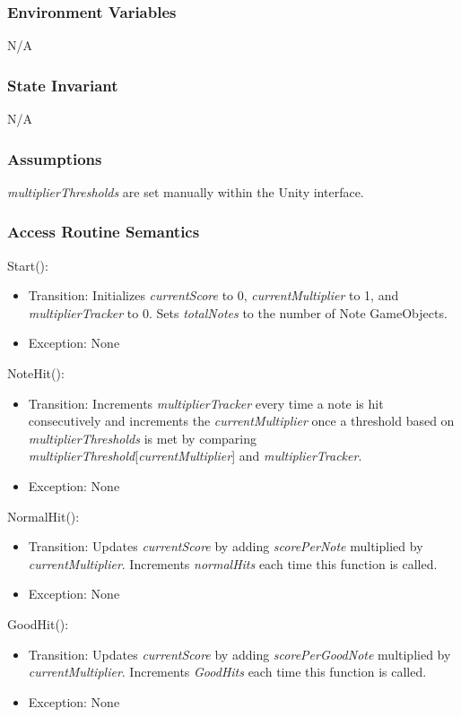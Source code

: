 \documentclass[12pt]{article}
\begin{document}
\subsubsection {Environment Variables}
N/A

\subsubsection {State Invariant}
N/A

\subsubsection {Assumptions}
\textit{multiplierThresholds} are set manually within the Unity interface.

\subsubsection {Access Routine Semantics}
\noindent Start():
\begin{itemize}
    \item Transition: Initializes \textit{currentScore} to 0, \textit{currentMultiplier} to 1, and \textit{multiplierTracker} to 0. Sets \textit{totalNotes} to the number of Note GameObjects.
    \item Exception: None
\end{itemize}

\noindent NoteHit():
\begin{itemize}
    \item Transition: Increments \textit{multiplierTracker} every time a note is hit consecutively and increments the \textit{currentMultiplier} once a threshold based on \textit{multiplierThresholds} is met by comparing \textit{multiplierThreshold}[\textit{currentMultiplier}] and \textit{multiplierTracker}.
    \item Exception: None
\end{itemize}

\noindent NormalHit():
\begin{itemize}
    \item Transition: Updates \textit{currentScore} by adding \textit{scorePerNote} multiplied by \textit{currentMultiplier}. Increments \textit{normalHits} each time this function is called.
    \item Exception: None
\end{itemize}

\noindent GoodHit():
\begin{itemize}
    \item Transition: Updates \textit{currentScore} by adding \textit{scorePerGoodNote} multiplied by \textit{currentMultiplier}. Increments \textit{GoodHits} each time this function is called.
    \item Exception: None
\end{itemize}
\end{document}
